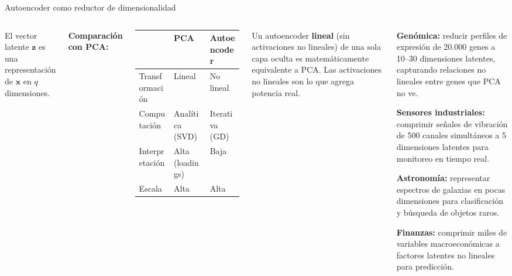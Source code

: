 \documentclass[aspectratio=169]{beamer}
\begin{document}
\begin{frame}{Autoencoder como reductor de dimensionalidad}
\begin{columns}[T]
El vector latente $\mathbf{z}$ es una representación de $\mathbf{x}$ en $q$ dimensiones.

\medskip
\textbf{Comparación con PCA:}

\medskip
{\small
\begin{tabular}{lll}
\toprule
 & \textbf{PCA} & \textbf{Autoencoder} \\
\midrule
Transformación & Lineal & No lineal \\
Computación    & Analítica (SVD) & Iterativa (GD) \\
Interpretación & Alta (loadings) & Baja \\
Escala         & Alta & Alta \\
\bottomrule
\end{tabular}
}

\medskip
\begin{concepto}
Un autoencoder \textbf{lineal} (sin activaciones no lineales) de una sola capa oculta es matemáticamente equivalente a PCA. Las activaciones no lineales son lo que agrega potencia real.
\end{concepto}

\begin{aplicacion}
\textbf{Genómica:} reducir perfiles de expresión de 20.000 genes a 10--30 dimensiones latentes, capturando relaciones no lineales entre genes que PCA no ve.

\medskip
\textbf{Sensores industriales:} comprimir señales de vibración de 500 canales simultáneos a 5 dimensiones latentes para monitoreo en tiempo real.

\medskip
\textbf{Astronomía:} representar espectros de galaxias en pocas dimensiones para clasificación y búsqueda de objetos raros.

\medskip
\textbf{Finanzas:} comprimir miles de variables macroeconómicas a factores latentes no lineales para predicción.
\end{aplicacion}
\end{columns}
\end{frame}
\end{document}
